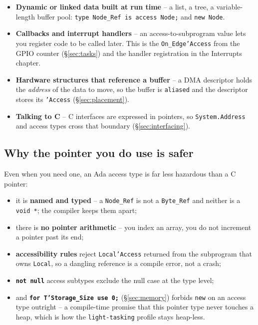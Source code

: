 \begin{itemize}
  \item \textbf{Dynamic or linked data built at run time} -- a list, a tree, a
        variable-length buffer pool: \texttt{type Node\_Ref is access Node;} and
        \texttt{new Node}.
  \item \textbf{Callbacks and interrupt handlers} -- an access-to-subprogram
        value lets you register code to be called later. This is the
        \texttt{On\_Edge'Access} from the GPIO counter (\S\ref{sec:tasks}) and the
        handler registration in the Interrupts chapter.
  \item \textbf{Hardware structures that reference a buffer} -- a DMA descriptor
        holds the \emph{address} of the data to move, so the buffer is
        \texttt{aliased} and the descriptor stores its \texttt{'Access}
        (\S\ref{sec:placement}).
  \item \textbf{Talking to C} -- C interfaces are expressed in pointers, so
        \texttt{System.Address} and access types cross that boundary
        (\S\ref{sec:interfacing}).
\end{itemize}

\subsection{Why the pointer you do use is safer}

Even when you need one, an Ada access type is far less hazardous than a C pointer:

\begin{itemize}
  \item it is \textbf{named and typed} -- a \texttt{Node\_Ref} is not a
        \texttt{Byte\_Ref} and neither is a \texttt{void *}; the compiler keeps
        them apart;
  \item there is \textbf{no pointer arithmetic} -- you index an array, you do not
        increment a pointer past its end;
  \item \textbf{accessibility rules} reject \texttt{Local'Access} returned from the
        subprogram that owns \texttt{Local}, so a dangling reference is a compile
        error, not a crash;
  \item \texttt{\textbf{not null}} access subtypes exclude the null case at the
        type level;
  \item and \texttt{\textbf{for T'Storage\_Size use 0;}} (\S\ref{sec:memory})
        forbids \texttt{new} on an access type outright -- a compile-time promise
        that this pointer type never touches a heap, which is how the
        \texttt{light-tasking} profile stays heap-less.
\end{itemize}

